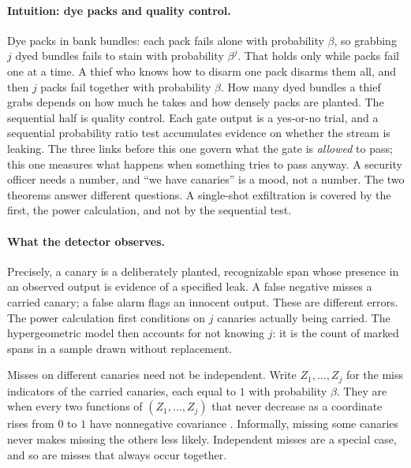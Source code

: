 \documentclass[11pt,a4paper]{article}
\theoremstyle{definition}
\begin{document}
\paragraph{Intuition: dye packs and quality control.}
Dye packs in bank bundles: each pack fails alone with probability $\beta$, so
grabbing $j$ dyed bundles fails to stain with probability $\beta^j$. That
holds only while packs fail one at a time. A thief who knows how to disarm one
pack disarms them all, and then $j$ packs fail together with probability
$\beta$. How many
dyed bundles a thief grabs depends on how much he takes and how densely packs
are planted. The sequential half is quality control. Each gate output is a
yes-or-no trial, and a sequential probability ratio test accumulates evidence
on whether the stream is leaking. The three links before this one govern what
the gate is \emph{allowed} to pass; this one measures what happens when
something tries to pass anyway. A security officer needs a number, and
``we have canaries'' is a mood, not a number. The two theorems answer different
questions. A single-shot exfiltration is covered by the first, the power
calculation, and not by the sequential test.

\paragraph{What the detector observes.}
Precisely, a canary is a deliberately planted, recognizable span whose
presence in an observed output is evidence of a specified leak. A false negative misses
a carried canary; a false alarm flags an innocent output. These are different
errors. The power calculation first conditions on $j$ canaries actually being
carried. The hypergeometric model then accounts for not knowing $j$: it is the
count of marked spans in a sample drawn without replacement.

Misses on different canaries need not be independent. Write $Z_1,\dots,Z_j$
for the miss indicators of the carried canaries, each equal to $1$ with
probability $\beta$. They are  when every two
functions of $(Z_1,\dots,Z_j)$ that never decrease as a coordinate rises from
$0$ to $1$ have nonnegative covariance . Informally, missing
some canaries never makes missing the others less likely. Independent misses
are a special case, and so are misses that always occur together.
\end{document}
